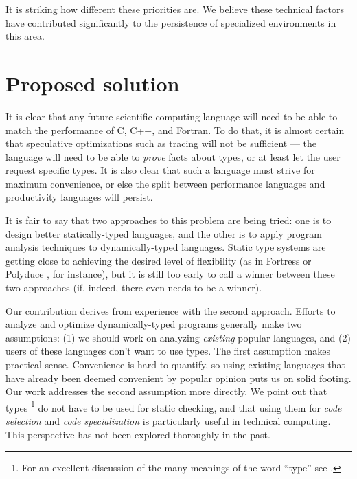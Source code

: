 It is striking how different these priorities are. We believe these technical factors have
contributed significantly to the persistence of specialized environments in this area.





\section{Proposed solution}

It is clear that any future scientific computing language will need to be able to
match the performance of C, C++, and Fortran. To do that, it is almost certain
that speculative optimizations such as tracing \cite{tracingjit} will not be sufficient ---
the language will need to be able to \emph{prove} facts about types, or at least
let the user request specific types. It is also clear that such a language must
strive for maximum convenience, or else the split between performance languages
and productivity languages will persist.

It is fair to say that two approaches to this problem are being tried: one is
to design better statically-typed languages, and the other is to apply
program analysis techniques to dynamically-typed languages.
Static type systems are getting close to achieving the desired level
of flexibility (as in Fortress \cite{fortresspec} or Polyduce \cite{polyduce1},
for instance), but it is still too early to call a winner between these two
approaches (if, indeed, there even needs to be a winner).

Our contribution derives from experience with the second approach.
Efforts to analyze and optimize dynamically-typed programs generally make two
assumptions: (1) we should work on analyzing \emph{existing} popular
languages, and (2) users of these languages don't want to use types.
The first assumption makes practical sense.
Convenience is hard to quantify, so using existing languages that have already
been deemed convenient by popular opinion puts us on solid footing.
Our work addresses the second assumption more directly.
We point out that types
\footnote{For an excellent discussion of the many meanings of the word ``type''
see \cite{Kell2014}.}
do not have to be used for static checking, and that using them for
\emph{code selection} and \emph{code specialization} is particularly useful in
technical computing.
This perspective has not been explored thoroughly in the past.

